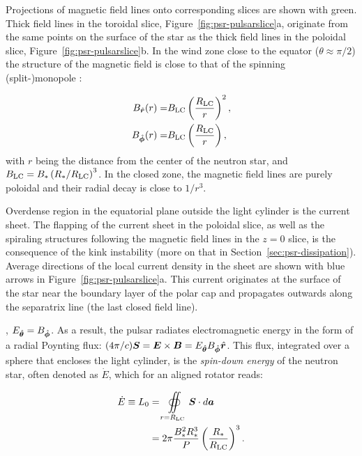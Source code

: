 Projections of magnetic field lines onto corresponding slices are shown with green. Thick field lines in the toroidal slice, Figure~\ref{fig:psr-pulsarslice}a, originate from the same points on the surface of the star as the thick field lines in the poloidal slice, Figure~\ref{fig:psr-pulsarslice}b. In the wind zone close to the equator ($\theta\approx \pi/2$) the structure of the magnetic field is close to that of the spinning (split-)monopole \citep{1973ApJ...180L.133M}:

\begin{equation}
\begin{split}
\label{eq:psr-bfields}
    B_{{\hat{\bm{r}}}}(r) =& B_{\rm LC}\left(\frac{R_{\rm LC}}{r}\right)^2,\\
    B_{{\hat{\bm{\phi}}}}(r) =& B_{\rm LC}\left(\frac{R_{\rm LC}}{r}\right),
\end{split}
\end{equation}
\noindent with $r$ being the distance from the center of the neutron star, and $B_{\rm LC} = B_*\left(R_*/R_{\rm LC}\right)^3$. In the closed zone, the magnetic field lines are purely poloidal and their radial decay is close to $1/r^3$. 

Overdense region in the equatorial plane outside the light cylinder is the current sheet. The flapping of the current sheet in the poloidal slice, as well as the spiraling structures following the magnetic field lines in the $z=0$ slice, is the consequence of the kink instability (more on that in Section~\ref{sec:psr-dissipation}). Average directions of the local current density in the sheet are shown with blue arrows in Figure~\ref{fig:psr-pulsarslice}a. This current originates at the surface of the star near the boundary layer of the polar cap and propagates outwards along the separatrix line (the last closed field line). 

, $E_{{\hat{\bm{\theta}}}} = B_{{\hat{\bm{\phi}}}}$. As a result, the pulsar radiates electromagnetic energy in the form of a radial Poynting flux: $(4\pi / c)\bm{S} = \bm{E}\times\bm{B} = E_{{\hat{\bm{\theta}}}} B_{{\hat{\bm{\phi}}}} {\hat{\bm{r}}}$. This flux, integrated over a sphere that encloses the light cylinder, is the \emph{spin-down energy} of the neutron star, often denoted as $\dot{E}$, which for an aligned rotator reads:

\begin{equation}
\label{eq:psr-edot}
\begin{split}
    \dot{E} \equiv L_0 &= \oiint\limits_{r=R_{\rm LC}} \bm{S} \cdot d\bm{a} \\
    &= 2\pi \frac{B_*^2 R_*^3}{P}\left(\frac{R_*}{R_{\rm LC}}\right)^3.
\end{split}
\end{equation}

